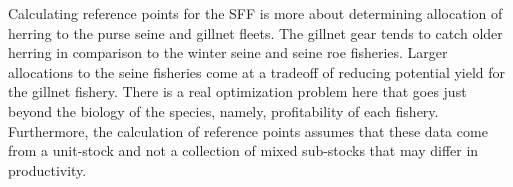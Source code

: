 Calculating reference points for the SFF is more about determining allocation of herring to the purse seine and gillnet fleets.  The gillnet gear tends to catch older herring in comparison to the winter seine and seine roe fisheries.  Larger allocations to the seine fisheries come at a tradeoff of reducing potential yield for the gillnet fishery.  There is a real optimization problem here that goes just beyond the biology of the species, namely, profitability of each fishery. Furthermore, the calculation of reference points assumes that these data come from a unit-stock and not a collection of mixed sub-stocks that may differ in productivity.



